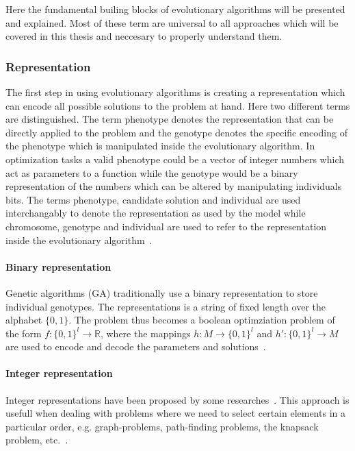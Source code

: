 Here the fundamental builing blocks of evolutionary algorithms will be presented and explained. Most of these term are universal to all approaches which will be covered in this thesis and neccesary to properly understand them.

\subsubsection{Representation}

The first step in using evolutionary algorithms is creating a representation which can encode all possible solutions to the problem at hand. Here two different terms are distinguished. The term phenotype denotes the representation that can be directly applied to the problem and the genotype denotes the specific encoding of the phenotype which is manipulated inside the evolutionary algorithm. In optimization tasks a valid phenotype could be a vector of integer numbers which act as parameters to a function while the genotype would be a binary representation of the numbers which can be altered by manipulating individuals bits. The terms phenotype, candidate solution and individual are used interchangably to denote the representation as used by the model while chromosome, genotype and individual are used to refer to the representation inside the evolutionary algorithm~\cite{Eiben2015_whatevolutionary}.

\paragraph{Binary representation}

Genetic algorithms (GA) traditionally use a binary representation to store individual genotypes. The representations is a string of fixed length over the alphabet $\{0,1\}$. The problem thus becomes a boolean optimziation problem of the form $ f:\{0,1\}^l \rightarrow \mathbb{R}$, where the mappings $h:M \rightarrow \{0,1\}^l$ and $h':\{0,1\}^l \rightarrow M$ are used to encode and decode the parameters and solutions~\cite{back1997evolutionary}.

\paragraph{Integer representation}

Integer representations have been proposed by some researches~\cite{unter611evolutionary}. This approach is usefull when dealing with problems where we need to select certain elements in a particular order, e.g. graph-problems, path-finding problems, the knapsack problem, etc.~\cite{Eiben201511}.


